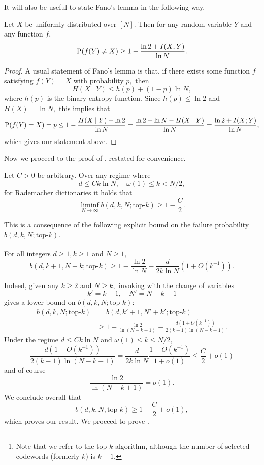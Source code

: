 It will also be useful to state Fano's lemma in the following way.

\begin{lemma} \label{lemma:fano}
Let $X$ be uniformly distributed over $[N]$. Then for any random variable $Y$ and any function $f,$
$$
\operatorname{P}(f(Y) \neq X) \ge 1 - \frac{\ln 2 + I(X ; Y)}{\ln N}.
$$
\end{lemma}

\begin{proof}
A usual statement of Fano's lemma is that, if there exists some function $f$ satisfying $f(Y) = X$ with probability $p,$ then
$$
H(X \mid Y) \le h(p) + (1 - p) \ln N,
$$
where $h(p)$ is the binary entropy function. Since $h(p) \le \ln 2$ and $H(X) = \ln N,$ this implies that
$$
\operatorname{P}(f(Y) = X) = p \le 1 - \frac{H(X \mid Y) - \ln 2}{\ln N} = \frac{\ln 2 + \ln N - H(X \mid Y)}{\ln N} = \frac{\ln 2 + I(X; Y)}{\ln N},
$$
which gives our statement above.
\end{proof}

Now we proceed to the proof of , restated for convenience.

\begin{proposition*}
    Let $C > 0$ be arbitrary. Over any regime where
    $$
    d \le C k \ln N, \quad \omega(1) \le k < N/2,
    $$
    for Rademacher dictionaries it holds that
    $$
    \liminf_{N \to \infty} b(d, k, N; \text{top-$k$}) \ge 1 - \frac C 2.
    $$
\end{proposition*}

This is a consequence of the following explicit bound on the failure probability $b(d, k, N; \text{top-$k$})$.

\begin{lemma}\label{lemma:explicit}
For all integers $d \ge 1, k \ge 1$ and $N \ge 1,$\footnote{Note that we refer to the top-$k$ algorithm, although the number of selected codewords (formerly $k$) is $k + 1.$}
$$
b(d, k + 1, N + k; \text{top-}k) \ge 1 - \frac{\ln 2}{\ln N} - \frac{d}{2 k \ln N}(1 + O(k^{-1})).
$$
\end{lemma}

Indeed, given any $k \ge 2$ and $N \ge k,$ invoking  with the change of variables
$$
k' = k - 1, \quad N' = N - k + 1
$$
gives a lower bound on $b(d, k, N; \text{top-}k)$:
\begin{align*}
b(d, k, N; \text{top-}k) & = b(d, k' + 1, N' + k'; \text{top-}k)  \\
& \ge 1 - \frac{\ln 2}{\ln (N - k + 1)} - \frac{d (1 + O(k^{-1}))}{2 (k - 1) \ln (N - k + 1)}.
\end{align*}
Under the regime $d \le C k \ln N$ and $\omega(1) \le k \le N/2,$
$$
\frac{d (1 + O(k^{-1}))}{2(k - 1) \ln(N - k + 1)} = \frac{d}{2 k \ln N} \frac{1 + O(k^{-1})}{1 + o(1)} \le \frac{C}{2} + o(1)
$$
and of course
$$
\frac{\ln 2}{\ln (N - k + 1)} = o(1).
$$
We conclude overall that
$$
b(d, k, N, \text{top-}k) \ge 1 - \frac{C}{2} + o(1),
$$
which proves our result. We proceed to prove .

